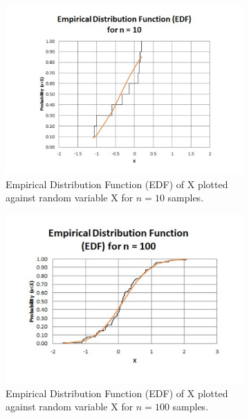 \documentclass[titlepage, 11pt]{article}
\begin{document}
\begin{figure}[ht]
\begin{subfigure}{.5\textwidth}
  \centering
  \includegraphics[width=\linewidth]{EDF10.pdf}
  \caption{Empirical Distribution Function (EDF) of X plotted against random variable X for $n=10$ samples. }
  \label{fig:q31}
\end{subfigure}
\begin{subfigure}{.5\textwidth}
  \centering
  \includegraphics[width=\linewidth]{EDF100.pdf}
  \caption{Empirical Distribution Function (EDF) of X plotted against random variable X for $n=100$ samples. }
  \label{fig:q32}
  \end{subfigure}
  \begin{subfigure}{.5\textwidth}
  \begin{center}

\end{center}
\end{subfigure}
\end{figure}
\end{document}

